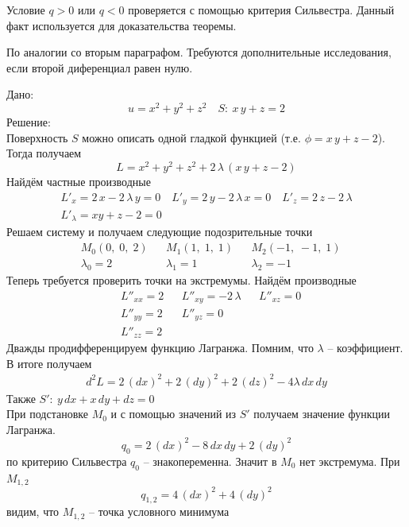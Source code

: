 \begin{Note}
    Условие $q > 0$ или $q < 0$ проверяется с помощью критерия Сильвестра. Данный факт используется для доказательства теоремы. 
\end{Note}

\begin{Note}
    По аналогии со вторым параграфом. Требуются дополнительные исследования, если второй диференциал равен нулю.
\end{Note}

\begin{Example}
    Дано:
    \[
        u = x^2 + y^2 + z^2 \quad S:\: x\,y + z = 2
    \]
    Решение:\\
    Поверхность $S$ можно описать одной гладкой функцией (т.е. $\phi = x\,y + z - 2$). Тогда получаем
    \begin{equation*}
        L = x^2 + y^2 + z^2 + 2\,\lambda\,(x\,y + z - 2)
    \end{equation*}
    Найдём частные производные
    \begin{gather*}
        L'_x = 2\,x - 2\,\lambda\,y = 0 \quad L'_y = 2\,y - 2\,\lambda\,x = 0 \quad L'_z = 2\,z - 2\,\lambda \\ L'_{\lambda} = xy + z - 2 = 0
    \end{gather*}
    Решаем систему и получаем следующие подозрительные точки
    \begin{align*}
        &M_0(0,\; 0,\; 2) && M_1(1,\; 1,\; 1) && M_2(-1,\; -1,\; 1)\\
        & \lambda_0 = 2 && \lambda_1 = 1 && \lambda_2 = -1
    \end{align*}
    Теперь требуется проверить точки на экстремумы. Найдём производные
    \begin{align*}
        &L''_{xx} = 2 && L''_{xy} = -2\,\lambda && L''_{xz} = 0 \\
        &L''_{yy} = 2 && L''_{yz} = 0\\
        &L''_{zz} = 2
    \end{align*}
    Дважды продифференцируем функцию Лагранжа. Помним, что $\lambda$ -- коэффициент. В итоге получаем
    \begin{gather*}
        d^2L = 2\,(dx)^2 + 2\,(dy)^2 + 2\,(dz)^2 - 4\lambda\,dx\,dy
    \end{gather*}
    Также $S':\: y\,dx + x\,dy + dz = 0$\\
    При подстановке $M_0$ и с помощью значений из $S'$ получаем значение функции Лагранжа.
    \[
        q_0 = 2\,(dx)^2 - 8\,dx\,dy + 2\,(dy)^2
    \]
    по критерию Сильвестра $q_0$ -- знакопеременна. Значит в $M_0$ нет экстремума.
    При $M_{1,2}$
    \[
        q_{1,2} = 4\,(dx)^2 + 4\,(dy)^2
    \]
    видим, что $M_{1,2}$ -- точка условного минимума
\end{Example}